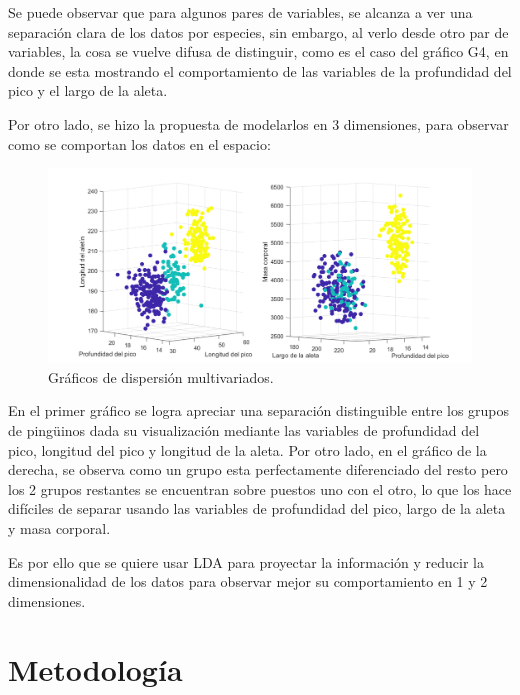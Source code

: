 \documentclass[11pt, letterpaper]{article}
\begin{document}
Se puede observar que para algunos pares de variables, se alcanza a ver una separación clara de los datos por especies, sin embargo, al verlo desde otro par de variables, la cosa se vuelve difusa de distinguir, como es el caso del gráfico G4, en donde se esta mostrando el comportamiento de las variables de la profundidad del pico y el largo de la aleta.

\newpage

Por otro lado, se hizo la propuesta de modelarlos en 3 dimensiones, para observar como se comportan los datos en el espacio:

\begin{figure}[h!]
	\centering
	\begin{minipage}{1.1\textwidth}
		\centering
		\includegraphics[width=\textwidth]{IMG/G2.png}
		\caption{Gráficos de dispersión multivariados.}
		\label{fig:f3}
	\end{minipage}\hfill
\end{figure}


En el primer gráfico se logra apreciar una separación distinguible entre los grupos de pingüinos dada su visualización mediante las variables de profundidad del pico, longitud del pico y longitud de la aleta. Por otro lado, en el gráfico de la derecha, se observa como un grupo esta perfectamente diferenciado del resto pero los 2 grupos restantes se encuentran sobre puestos uno con el otro, lo que los hace difíciles de separar usando las variables de profundidad del pico, largo de la aleta y masa corporal.

Es por ello que se quiere usar LDA para proyectar la información y reducir la dimensionalidad de los datos para observar mejor su comportamiento en 1 y 2 dimensiones.

	
	\newpage
	
	\section{Metodología}
	
\end{document}
